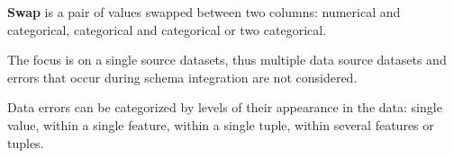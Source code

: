 \textbf{Swap} is a pair of values swapped between two columns: numerical and categorical, categorical and categorical or two categorical.





The focus is on a single source datasets, thus multiple data source datasets and errors that occur during schema integration are not considered.


Data errors can be categorized by levels of their appearance in the data: single value, within a single feature, within a single tuple, within several features or tuples.



